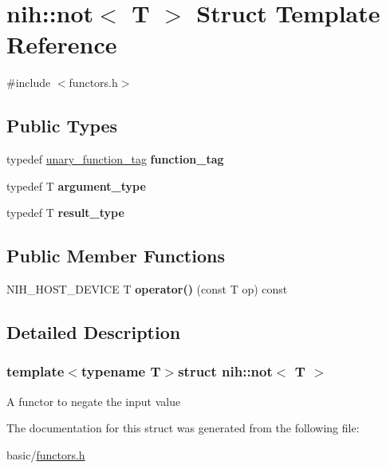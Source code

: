 \hypertarget{structnih_1_1not}{
\section{nih\-:\-:not$<$ \-T $>$ \-Struct \-Template \-Reference}
\label{structnih_1_1not}
}


{\ttfamily \#include $<$functors.\-h$>$}

\subsection*{\-Public \-Types}
\begin{DoxyCompactItemize}
\item 
\hypertarget{structnih_1_1not_aee513f5e55230dff5914ec094ff9f158}{
typedef \hyperlink{structnih_1_1unary__function__tag}{unary\-\_\-function\-\_\-tag} {\bfseries function\-\_\-tag}}
\label{structnih_1_1not_aee513f5e55230dff5914ec094ff9f158}

\item 
\hypertarget{structnih_1_1not_a31584fc11c3ed129808e97ba6b4da11b}{
typedef \-T {\bfseries argument\-\_\-type}}
\label{structnih_1_1not_a31584fc11c3ed129808e97ba6b4da11b}

\item 
\hypertarget{structnih_1_1not_a43cf00850126914d1aec29b225db4b55}{
typedef \-T {\bfseries result\-\_\-type}}
\label{structnih_1_1not_a43cf00850126914d1aec29b225db4b55}

\end{DoxyCompactItemize}
\subsection*{\-Public \-Member \-Functions}
\begin{DoxyCompactItemize}
\item 
\hypertarget{structnih_1_1not_abcb05b87d5d38ba09758f6c9ba1b4297}{
\-N\-I\-H\-\_\-\-H\-O\-S\-T\-\_\-\-D\-E\-V\-I\-C\-E \-T {\bfseries operator()} (const \-T op) const }
\label{structnih_1_1not_abcb05b87d5d38ba09758f6c9ba1b4297}

\end{DoxyCompactItemize}


\subsection{\-Detailed \-Description}
\subsubsection*{template$<$typename T$>$struct nih\-::not$<$ T $>$}

\-A functor to negate the input value 

\-The documentation for this struct was generated from the following file\-:\begin{DoxyCompactItemize}
\item 
basic/\hyperlink{functors_8h}{functors.\-h}\end{DoxyCompactItemize}
